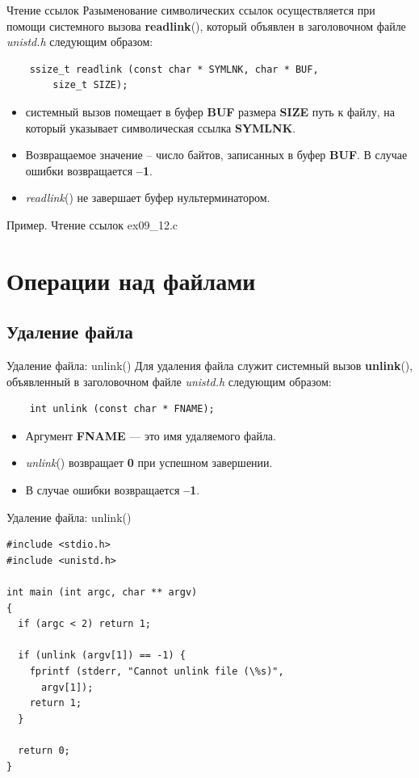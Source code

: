 \documentclass[xcolor=table]{beamer}
\begin{document}
\begin{frame}[fragile]{Чтение ссылок}
	Разыменование символических ссылок осуществляется при помощи системного вызова \textbf{readlink}(), который объявлен в заголовочном файле \textit{unistd.h} следующим образом:
	\begin{verbatim}
	ssize_t readlink (const char * SYMLNK, char * BUF, 
    	size_t SIZE);
	\end{verbatim}
	\begin{itemize}
		\item системный вызов помещает в буфер \textbf{BUF} размера \textbf{SIZE} путь к файлу, на который указывает символическая ссылка \textbf{SYMLNK}. 
		\item Возвращаемое значение -- число байтов, записанных в буфер \textbf{BUF}. В случае ошибки возвращается \textbf{–1}.
		\item \textit{readlink}() не завершает буфер нультерминатором.
	\end{itemize}
	\begin{block}{Пример. Чтение ссылок}
		ex09\_12.c
	\end{block}
\end{frame}

\section{Операции над файлами}

\subsection{Удаление файла}

\begin{frame}[fragile]{Удаление файла: unlink()}
	Для удаления файла служит системный вызов \textbf{unlink}(), объявленный в заголовочном файле \textit{unistd.h} следующим образом:
	\begin{verbatim}
	int unlink (const char * FNAME);
	\end{verbatim}
	\begin{itemize}
		\item Аргумент \textbf{FNAME} — это имя удаляемого файла. 
		\item \textit{unlink}() возвращает \textbf{0} при успешном завершении. 
		\item В случае ошибки возвращается \textbf{–1}.
	\end{itemize}
\end{frame}

\begin{frame}[fragile]{Удаление файла: unlink()}
	\begin{verbatim}
#include <stdio.h>
#include <unistd.h>

int main (int argc, char ** argv)
{
  if (argc < 2) return 1;
  
  if (unlink (argv[1]) == -1) {
   	fprintf (stderr, "Cannot unlink file (\%s)", 
   	  argv[1]);
   	return 1;
  }
  
  return 0;
}
	\end{verbatim}
\end{frame}
\end{document}
